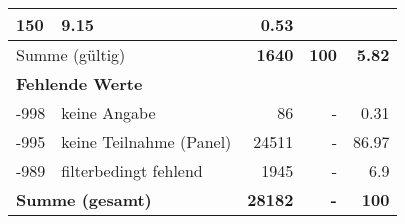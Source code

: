 \begin{longtable}{lXrrr}
       \num{150} &
       \num[round-mode=places,round-precision=2]{9.15} &
         \num[round-mode=places,round-precision=2]{0.53} \\
     \midrule
     \multicolumn{2}{l}{Summe (gültig)} &
       \textbf{\num{1640}} &
     \textbf{100} &
       \textbf{\num[round-mode=places,round-precision=2]{5.82}} \\
     \multicolumn{5}{l}{\textbf{Fehlende Werte}}\\
       -998 &
       keine Angabe &
         \num{86} &
        - &
         \num[round-mode=places,round-precision=2]{0.31} \\
       -995 &
       keine Teilnahme (Panel) &
         \num{24511} &
        - &
         \num[round-mode=places,round-precision=2]{86.97} \\
       -989 &
       filterbedingt fehlend &
         \num{1945} &
        - &
         \num[round-mode=places,round-precision=2]{6.9} \\
     \midrule
     \multicolumn{2}{l}{\textbf{Summe (gesamt)}} &
          \textbf{\num{28182}} &
        \textbf{-} &
        \textbf{100} \\
     \bottomrule
     \end{longtable}
     
